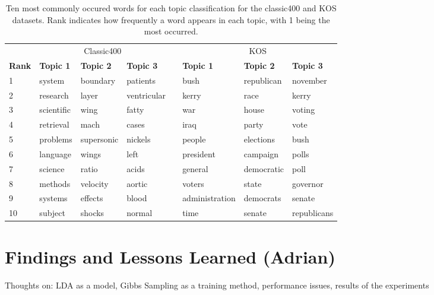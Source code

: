 \documentclass[10pt]{article}
\newcommand{\ra}[1]{\renewcommand{\arraystretch}{#1}}
\begin{document}
\begin{table}[t]
	\centering
    \ra{1.2}
	\begin{tabular}{@{} l l l l c l l l @{}}
        \toprule
        & \multicolumn{3}{c}{Classic400} & \phantom{abc} & \multicolumn{3}{c}{KOS}\\
        \cmidrule{2-4} \cmidrule{6-8}
        \bf{Rank} & \bf{Topic 1} & \bf{Topic 2} & \bf{Topic 3} && \bf{Topic 1} & \bf{Topic 2} & \bf{Topic 3} \\
        \midrule
         1 & system     & boundary      & patients      && bush             & republican    & november \\
         2 & research   & layer         & ventricular   && kerry            & race          & kerry \\
         3 & scientific & wing          & fatty         && war              & house         & voting \\
         4 & retrieval  & mach          & cases         && iraq             & party         & vote \\
         5 & problems   & supersonic    & nickels       && people           & elections     & bush \\
         6 & language   & wings         & left          && president        & campaign      & polls \\
         7 & science    & ratio         & acids         && general          & democratic    & poll \\
         8 & methods    & velocity      & aortic        && voters           & state         & governor \\ 
         9 & systems    & effects       & blood         && administration   & democrats     & senate \\
        10 & subject    & shocks        & normal        && time             & senate        & republicans \\
        \bottomrule
	\end{tabular}
	\caption{Ten most commonly occured words for each topic classification for the classic400 and KOS datasets. Rank indicates how frequently a word appears in each topic, with 1 being the most occurred.}
	\label{tab:most_common}
\end{table}



\section{Findings and Lessons Learned (Adrian)}
\label{sec:conclusion}

Thoughts on: LDA as a model, Gibbs Sampling as a training method, performance issues, results of the experiments




\end{document}
